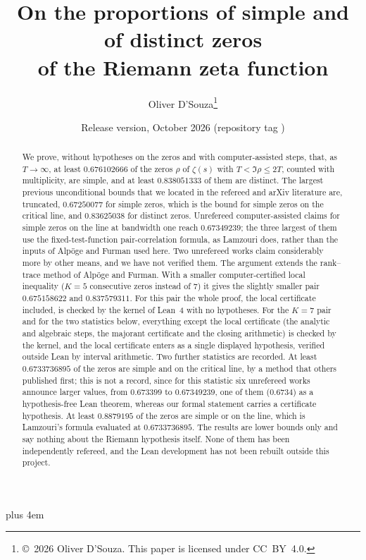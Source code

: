 \documentclass[11pt]{article}
\title{On the proportions of simple and of distinct zeros\\ of the Riemann zeta function}
\author{Oliver D'Souza\thanks{\copyright~2026 Oliver D'Souza. This paper is licensed under CC~BY~4.0.}}
\date{Release version, October 2026 (repository tag \repotag)}
\begin{document}
\maketitle

\begin{abstract}
We prove, without hypotheses on the zeros and with computer-assisted steps, that, as $T\to\infty$, at least $0.676102666$ of the zeros
$\rho$ of $\zeta(s)$ with $T<\Im\rho\le2T$, counted with multiplicity, are simple, and at least $0.838051333$ of them are distinct. The
largest previous unconditional bounds that we located in the refereed and arXiv literature are, truncated, $0.67250077$ for simple zeros, which is the bound for
simple zeros on the critical line, and $0.83625038$ for distinct zeros. Unrefereed computer-assisted claims for simple zeros on the line at
bandwidth one reach $0.67349239$; the three largest of them use the fixed-test-function pair-correlation formula, as Lamzouri does, rather
than the inputs of Alp\"oge and Furman used here. Two unrefereed works claim considerably more by other means, and we have not verified
them.
The argument extends the rank--trace method of Alp\"oge and Furman. With a smaller computer-certified local inequality ($K=5$ consecutive
zeros instead of $7$) it gives the slightly smaller pair $0.675158622$ and $0.837579311$. For this pair the whole proof, the local
certificate included, is checked by the kernel of Lean~4 with no hypotheses. For the $K=7$ pair and for the two statistics below, everything
except the local certificate (the analytic and algebraic steps, the majorant certificate and the closing arithmetic) is checked by the
kernel, and the local certificate enters as a single displayed hypothesis, verified outside Lean by interval arithmetic. Two further
statistics are recorded. At least $0.6733736895$ of the zeros are simple and on the critical line, by a method that others published first;
this is not a record, since for this statistic six unrefereed works announce larger values, from $0.673399$ to $0.67349239$, one of them
($0.6734$) as a hypothesis-free Lean theorem, whereas our formal statement carries a certificate hypothesis. At least $0.8879195$ of the
zeros are simple or on the line, which is Lamzouri's formula evaluated at $0.6733736895$. The results are lower bounds only and say nothing
about the Riemann hypothesis itself. None of them has been independently refereed, and the Lean development has not been rebuilt outside
this project.
\end{abstract}

\tableofcontents










\appendix
{\rightskip=0pt plus 4em\relax %
\par}




\end{document}
